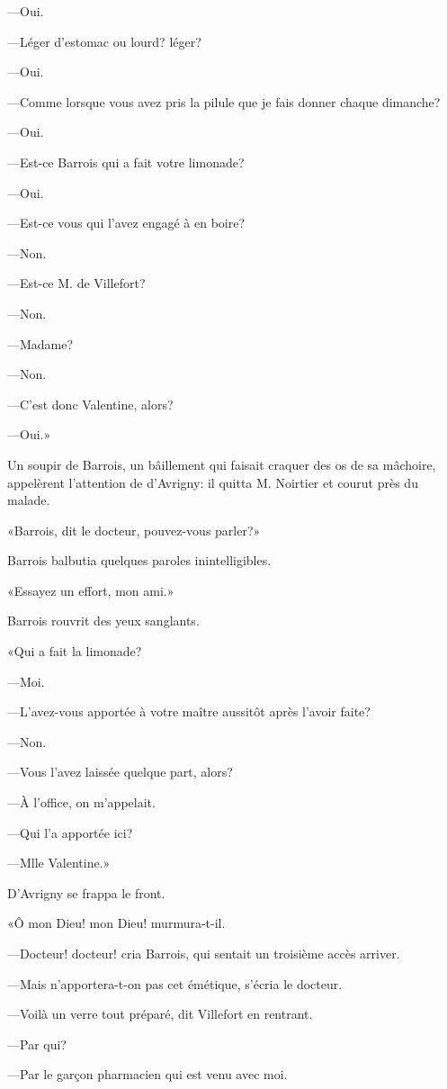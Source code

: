 —Oui. 

—Léger d'estomac ou lourd? léger? 

—Oui. 

—Comme lorsque vous avez pris la pilule que je fais donner chaque dimanche? 

—Oui. 

—Est-ce Barrois qui a fait votre limonade? 

—Oui.  

—Est-ce vous qui l'avez engagé à en boire? 

—Non. 

—Est-ce M. de Villefort? 

—Non. 

—Madame? 

—Non. 

—C'est donc Valentine, alors? 

—Oui.» 

Un soupir de Barrois, un bâillement qui faisait craquer des os de sa mâchoire, appelèrent l'attention de d'Avrigny: il quitta M. Noirtier et courut près du malade. 

«Barrois, dit le docteur, pouvez-vous parler?» 

Barrois balbutia quelques paroles inintelligibles. 

«Essayez un effort, mon ami.» 

Barrois rouvrit des yeux sanglants. 

«Qui a fait la limonade? 

—Moi. 

—L'avez-vous apportée à votre maître aussitôt après l'avoir faite? 

—Non. 

—Vous l'avez laissée quelque part, alors? 

—À l'office, on m'appelait. 

—Qui l'a apportée ici? 

—Mlle Valentine.» 

D'Avrigny se frappa le front. 

«Ô mon Dieu! mon Dieu! murmura-t-il. 

—Docteur! docteur! cria Barrois, qui sentait un troisième accès arriver. 

—Mais n'apportera-t-on pas cet émétique, s'écria le docteur. 

—Voilà un verre tout préparé, dit Villefort en rentrant. 

—Par qui? 

—Par le garçon pharmacien qui est venu avec moi. 

